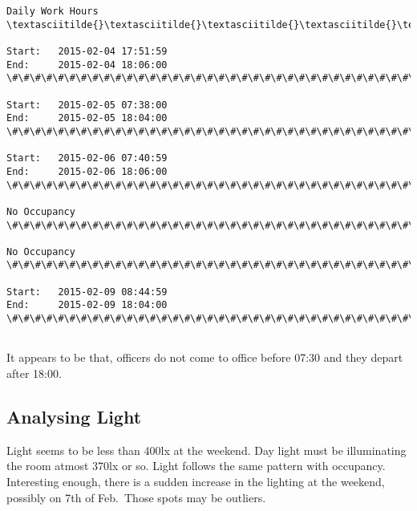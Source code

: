 \documentclass[11pt]{article}
\begin{document}
    \begin{Verbatim}[commandchars=\\\{\}]
Daily Work Hours
\textasciitilde{}\textasciitilde{}\textasciitilde{}\textasciitilde{}\textasciitilde{}\textasciitilde{}\textasciitilde{}\textasciitilde{}\textasciitilde{}\textasciitilde{}\textasciitilde{}\textasciitilde{}\textasciitilde{}\textasciitilde{}\textasciitilde{}\textasciitilde{}\textasciitilde{}\textasciitilde{}\textasciitilde{}\textasciitilde{}\textasciitilde{}\textasciitilde{}\textasciitilde{}\textasciitilde{}\textasciitilde{}\textasciitilde{}\textasciitilde{}\textasciitilde{}\textasciitilde{}\textasciitilde{}\textasciitilde{}\textasciitilde{}\textasciitilde{}\textasciitilde{}\textasciitilde{}\textasciitilde{}\textasciitilde{}\textasciitilde{}\textasciitilde{}\textasciitilde{}

Start:	 2015-02-04 17:51:59
End:	 2015-02-04 18:06:00
\#\#\#\#\#\#\#\#\#\#\#\#\#\#\#\#\#\#\#\#\#\#\#\#\#\#\#\#\#\#\#\#\#\#\#\#\#\#\#\#

Start:	 2015-02-05 07:38:00
End:	 2015-02-05 18:04:00
\#\#\#\#\#\#\#\#\#\#\#\#\#\#\#\#\#\#\#\#\#\#\#\#\#\#\#\#\#\#\#\#\#\#\#\#\#\#\#\#

Start:	 2015-02-06 07:40:59
End:	 2015-02-06 18:06:00
\#\#\#\#\#\#\#\#\#\#\#\#\#\#\#\#\#\#\#\#\#\#\#\#\#\#\#\#\#\#\#\#\#\#\#\#\#\#\#\#

No Occupancy
\#\#\#\#\#\#\#\#\#\#\#\#\#\#\#\#\#\#\#\#\#\#\#\#\#\#\#\#\#\#\#\#\#\#\#\#\#\#\#\#

No Occupancy
\#\#\#\#\#\#\#\#\#\#\#\#\#\#\#\#\#\#\#\#\#\#\#\#\#\#\#\#\#\#\#\#\#\#\#\#\#\#\#\#

Start:	 2015-02-09 08:44:59
End:	 2015-02-09 18:04:00
\#\#\#\#\#\#\#\#\#\#\#\#\#\#\#\#\#\#\#\#\#\#\#\#\#\#\#\#\#\#\#\#\#\#\#\#\#\#\#\#


    \end{Verbatim}

    It appears to be that, officers do not come to office before 07:30 and
they depart after 18:00.

    \hypertarget{analysing-light}{%
\subsection{Analysing Light}\label{analysing-light}}

    Light seems to be less than 400lx at the weekend. Day light must be
illuminating the room atmost 370lx or so. Light follows the same pattern
with occupancy. Interesting enough, there is a sudden increase in the
lighting at the weekend, possibly on 7th of Feb.~Those spots may be
outliers.
\end{document}
